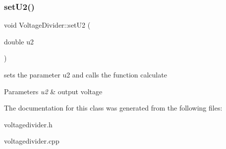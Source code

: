 \subsubsection{\texorpdfstring{set\+U2()}{setU2()}}
{\footnotesize\ttfamily void Voltage\+Divider\+::set\+U2 (\begin{DoxyParamCaption}\item[{double}]{u2 }\end{DoxyParamCaption})}



sets the parameter u2 and calls the function calculate 


\begin{DoxyParams}{Parameters}
{\em u2} & output voltage \\
\hline
\end{DoxyParams}


The documentation for this class was generated from the following files\+:\begin{DoxyCompactItemize}
\item 
voltagedivider.\+h\item 
voltagedivider.\+cpp\end{DoxyCompactItemize}
